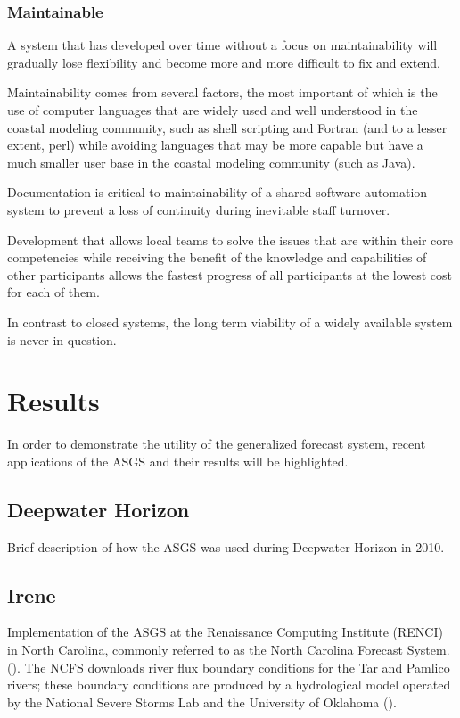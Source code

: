 \documentclass[12pt]{article}
\begin{document}
\subsubsection{Maintainable}

A system that has developed over time without a focus on 
maintainability will gradually lose flexibility and become more and 
more difficult to fix and extend. 

Maintainability comes from several factors, the most important of 
which is the use of computer languages that are widely used and well 
understood in the coastal modeling community, such as shell 
scripting and Fortran (and to a lesser extent, perl) while avoiding 
languages that may be more capable but have a much smaller user base 
in the coastal modeling community (such as Java).  

Documentation is critical to maintainability of a shared software 
automation system to prevent a loss of continuity during inevitable 
staff turnover.

Development that allows local teams to solve the issues that are 
within their core competencies while receiving the benefit of the 
knowledge and capabilities of other participants allows the fastest
progress of all participants at the lowest cost for each of them.

In contrast to closed systems, the long term viability of a widely
available system is never in question.  

\section{Results}

In order to demonstrate the utility of the generalized forecast 
system, recent applications of the ASGS and their results will be 
highlighted.


\subsection{Deepwater Horizon}

Brief description of how the ASGS was used during Deepwater Horizon in 2010.

\subsection{Irene}

Implementation of the ASGS at the Renaissance Computing Institute 
(RENCI) in North Carolina, commonly referred to as the North 
Carolina Forecast System. (\cite{BlantonBO2012}). The NCFS downloads 
river flux boundary conditions for the Tar and Pamlico rivers; these 
boundary conditions are produced by a hydrological model operated by 
the National Severe Storms Lab and the University of Oklahoma (\cite
{VanCootenS2011}). 
\end{document}
